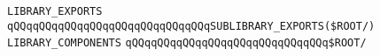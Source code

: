\newline
\newline
\newline
\verb|LIBRARY_EXPORTS|\newline
\newline
\verb|qQQqqQQqqQQqqQQqqQQqqQQqqQQqqQQqSUBLIBRARY_EXPORTS($ROOT/|\verb|)|\newline
\newline
\newline
\newline
\verb|LIBRARY_COMPONENTS|\newline
\newline
\verb|qQQqqQQqqQQqqQQqqQQqqQQqqQQqqQQq$ROOT/|\newline

